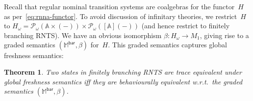 \documentclass[11pt,a4paper]{amsart}
\newtheorem{theorem}{Theorem}[section]
\newcommand{\Br}{\mathsf{bar}}
\newcommand{\abs}{\mathsf{abs}}
\newcommand{\Names}{\mathbb{A}}
\newcommand{\pow}{\mathcal{P}}
\newcommand{\powf}{\pow_{\omega}}
\newcommand{\bind}[1]{\langle #1\rangle}
\theoremstyle{plain}
\newcommand{\midmid}{\hspace{0.2ex}{\rule[-0.1ex]{0.6pt}{1.65ex}}\hspace{0.2ex}}
\newcommand{\newletter}[1]{{\midmid}#1}
\numberwithin{equation}{section}
\newcommand{\monad}{{\mathbb{M}}}
\newcommand{\+}[1]{\mathcal{#1}\xspace}
\theoremstyle{definition}
\begin{document}
Recall that regular nominal transition systems are coalgebras for the
functor~$H$ as per~\eqref{eq:rnna-functor}. To avoid discussion of
infinitary theories, we restrict~$H$ to
$H_\omega=\powf(\Names\times(-))\times\powf([\Names](-))$ (and hence
restrict to finitely branching RNTS). We
have an obvious isomorphism $\beta\colon H_\omega\to M_1$, giving
rise to a graded semantics $(\monad^\Br,\beta)$ for~$H$. This graded
semantics captures global freshness semantics:
\begin{theorem}\label{thm:global-freshness}
  Two states in finitely branching RNTS are trace equivalent under
  global freshness semantics iff they are behaviourally equivalent
  w.r.t.~the graded semantics $(\monad^\Br,\beta)$.
\end{theorem}
\end{document}
